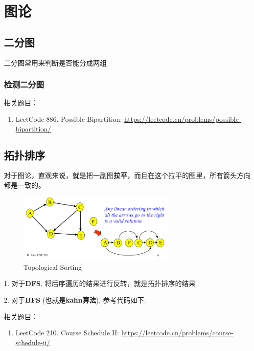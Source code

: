 \chapter{图论}
\begin{center}
\end{center}

\section{二分图}
二分图常用来判断是否能分成两组

\subsection{检测二分图}


\ifshowLink
相关题目：
    \begin{enumerate}
        \item LeetCode 886. Possible Bipartition: \href{https://leetcode.cn/problems/possible-bipartition/}{https://leetcode.cn/problems/possible-bipartition/}
    \end{enumerate}
\fi

\section{拓扑排序}
对于图论，直观来说，就是把一副图\textbf{拉平}，而且在这个拉平的图里，所有箭头方向都是一致的。

\begin{figure}[H] %
\centering %
\includegraphics[width=0.7\textwidth]{images_content/0.png} %
\caption{Topological Sorting} %
\end{figure}
1. 对于\textbf{DFS}, 将后序遍历的结果进行反转，就是拓扑排序的结果

2. 对于\textbf{BFS} (也就是\textbf{kahn算法}), 参考代码如下:


\ifshowLink
相关题目：
    \begin{enumerate}
        \item LeetCode 210. Course Schedule II: \href{https://leetcode.cn/problems/course-schedule-ii/}{https://leetcode.cn/problems/course-schedule-ii/}
    \end{enumerate}
\fi